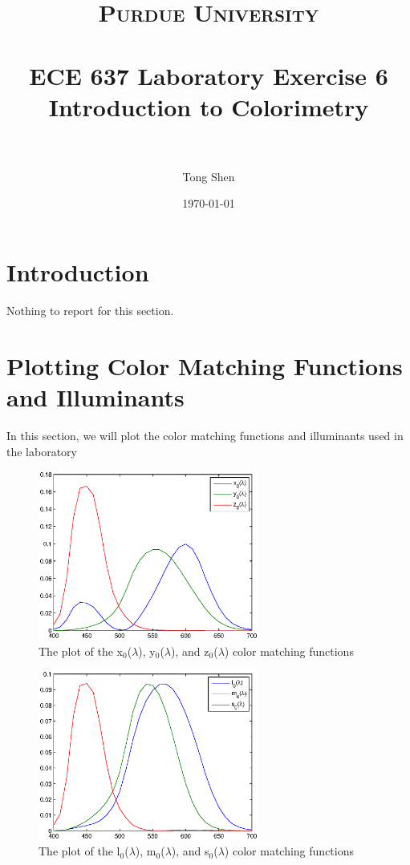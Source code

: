 \documentclass[paper=a4, fontsize=11pt]{scrartcl} %
\title{	
\normalfont \normalsize 
\textsc{Purdue University} \\ [25pt] %
\horrule{0.5pt} \\[0.4cm] %
\huge ECE 637 Laboratory Exercise 6 \\ 
\huge Introduction to Colorimetry\\%
\horrule{2pt} \\[0.5cm] %
}
\author{Tong Shen} %
\date{\normalsize\today} %
\numberwithin{equation}{section} %
\numberwithin{figure}{section} %
\numberwithin{table}{section} %
\begin{document}
\maketitle %

\section{Introduction}
Nothing to report for this section. 
\section{Plotting Color Matching Functions and Illuminants
}
In this section, we will plot the color matching functions and illuminants used in the laboratory

\begin{figure}[H]
	
	\centering
	\includegraphics[height = 2.2in]{1.eps}
	\caption{The plot of the x$_0$($\lambda$), y$_0$($\lambda$), and z$_0$($\lambda$) color matching functions}
	
	
	
\end{figure}
\begin{figure}[H]
	
	\centering
	\includegraphics[height = 2.2in]{2.eps}
	\caption{The plot of the l$_0$($\lambda$), m$_0$($\lambda$), and s$_0$($\lambda$) color matching functions}
	
	
	
\end{figure}
\end{document}
